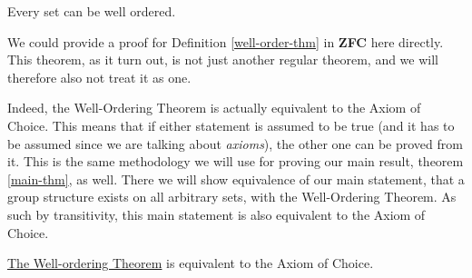 \documentclass[../../main.tex]{subfiles}
\begin{document}
\begin{definition}\cite[Theorem 15, p.39]{Jec78}\label{well-order-thm}
    \newline Every set can be well ordered.
\end{definition}

We could provide a proof for Definition \ref{well-order-thm} in \textbf{ZFC} here directly.
This theorem, as it turn out, is not just another regular theorem, and we will therefore also not treat it as one.

Indeed, the Well-Ordering Theorem is actually equivalent to the Axiom of Choice.
This means that if either statement is assumed to be true (and it has to be assumed since we are talking about \textit{axioms}),
the other one can be proved from it.
This is the same methodology we will use for proving our main result, theorem \ref{main-thm}, as well.
There we will show equivalence of our main statement, that a group structure exists on all arbitrary sets, with the Well-Ordering Theorem.
As such by transitivity, this main statement is also equivalent to the Axiom of Choice.

\begin{theorem}
    \hyperref[well-order-thm]{The Well-ordering Theorem} is equivalent to the Axiom of Choice. %
\end{theorem}
\end{document}
